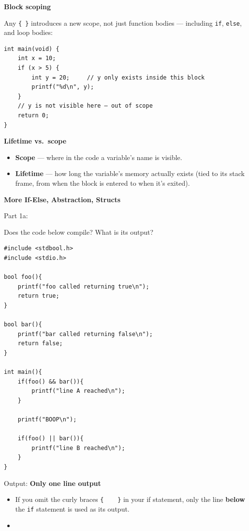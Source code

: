 \documentclass[11pt,a4paper]{article}
\providecommand{\tightlist}{\setlength{\itemsep}{0pt}\setlength{\parskip}{0pt}}
\begin{document}
\textbf{Block scoping}

Any \texttt{\{\ \}} introduces a new scope, not just function bodies --- including \texttt{if}, \texttt{else}, and loop bodies:

\begin{lstlisting}[style=cscode]
int main(void) {
    int x = 10;
    if (x > 5) {
        int y = 20;     // y only exists inside this block
        printf("%d\n", y);
    }
    // y is not visible here — out of scope
    return 0;
}
\end{lstlisting}

\textbf{Lifetime vs.~scope}

\begin{itemize}
\tightlist
\item
  \textbf{Scope} --- where in the code a variable's name is visible.
\item
  \textbf{Lifetime} --- how long the variable's memory actually exists (tied to its stack frame, from when the block is entered to when it's exited).
\end{itemize}

\label{2x-lab}
\hypertarget{2x-lab}{}

\textbf{More If-Else, Abstraction, Structs}

Part 1a:

Does the code below compile? What is its output?

\begin{lstlisting}[style=cscode]
#include <stdbool.h>
#include <stdio.h>
 
bool foo(){
	printf("foo called returning true\n");
	return true;
}
 
bool bar(){
	printf("bar called returning false\n");
	return false;
}
 
int main(){
	if(foo() && bar()){
		printf("line A reached\n");
	}
 
	printf("BOOP\n");
 
	if(foo() || bar()){
		printf("line B reached\n");
	}
}
\end{lstlisting}

Output: \textbf{Only one line output}

\begin{itemize}
\tightlist
\item
  If you omit the curly braces \texttt{\{\ \ \ \ \}} in your if statement, only the line \textbf{below} the \texttt{if} statement is used as its output.
\item
\end{itemize}
\end{document}
